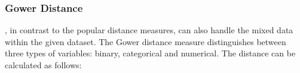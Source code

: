 	\subsubsection{Gower Distance}\label{gower}, in contrast to the popular distance measures, can also handle the mixed data within the given dataset. The Gower distance measure distinguishes between three types of variables: binary, categorical and numerical.
	The distance can be calculated as follows:
	
